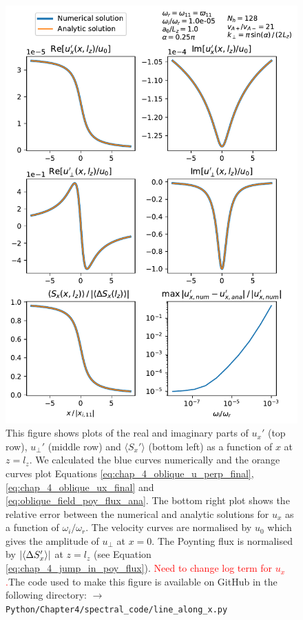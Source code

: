 \begin{figure}
    \centering
    \vspace{-20pt}
    \includegraphics[width=\textwidth,height=0.8\textheight,keepaspectratio]{figures/chapter04/oblique_field_spectral_method_along_x.pdf}
    \vspace{-10pt}
    \caption{This figure shows plots of the real and imaginary parts of $u_x'$ (top row), $u_\perp'$ (middle row) and $\langle S_x' \rangle$ (bottom left) as a function of $x$ at $z=l_z$. We calculated the blue curves numerically and the orange curves plot Equations \eqref{eq:chap_4_oblique_u_perp_final}, \eqref{eq:chap_4_oblique_ux_final} and \eqref{eq:oblique_field_poy_flux_ana}. The bottom right plot shows the relative error between the numerical and analytic solutions for $u_x$ as a function of $\omega_i / \omega_r$. The velocity curves are normalised by $u_0$ which gives the amplitude of $u_\perp$ at $x=0$. The Poynting flux is normalised by $\abs{\langle \Delta S_x' \rangle}$ at $z=l_z$ (see Equation \eqref{eq:chap_4_jump_in_poy_flux}). \textcolor{red}{Need to change log term for $u_x$.}The code used to make this figure is available on GitHub in the following directory:\newline
    \texttt{$\rightarrow$ Python/Chapter4/spectral\_code/line\_along\_x.py}}
    \label{fig:oblique_field_spectral_method_along_x}
    \vspace{-20pt}
\end{figure}

